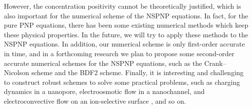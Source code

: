 However, the concentration positivity cannot be theoretically justified, which is also
important for the numerical scheme of the NSPNP equations. In fact, for the pure PNP
equations, there has been some existing numerical methods which keep these physical
properties. In the future, we will try to apply these methods to the NSPNP equations. In
addition, our numerical scheme is only first-order accurate in time, and in a forthcoming
research we plan to propose some second-order accurate numerical schemes for the NSPNP
equations, such as the Crank--Nicolson scheme and the BDF2 scheme. Finally, it is
interesting and challenging to construct robust schemes to solve some practical problems,
such as charging dynamics in a nanopore, electroosmotic flow in a nanochannel, and
electroconvective flow on an ion-selective surface \cite{Wang2017}, and so on.

%
%
%
%
%
